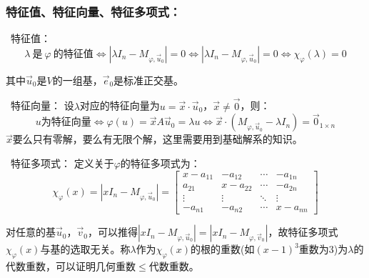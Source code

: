\documentclass[zihao=5,UTF8]{report}
\theoremstyle{mystyle} %
\begin{document}
\subsubsection{特征值、特征向量、特征多项式：}
\ 特征值：
\begin{equation*}
    \lambda\ \text{是}\ \varphi\ \text{的特征值} \Longleftrightarrow   \left |  \lambda I_n -M_{\varphi,\vec{u}_0} \right | = 0\Longleftrightarrow\left |  \lambda I_n -M_{\varphi,\vec{u}_0} \right |  = 0 \Longleftrightarrow \chi_{\varphi}(\lambda) = 0
\end{equation*}\par
{\color{gray}\small 其中$\vec{u}_0$是$V$的一组基，$\vec{e}_0$是标准正交基。}\par
{}\ 特征向量：
设$\lambda$对应的特征向量为$u = \vec{x}\cdot \vec{u}_0$，$ \vec{x} \ne \vec{0}$，则：
\begin{equation*}
   u \text{为特征向量} \Longleftrightarrow \varphi(u) = \vec{x}A\vec{u}_0 = \lambda u \Longleftrightarrow \vec{x}\cdot ( M_{\varphi,\vec{u}_0}- \lambda I_n )  = \vec{0}_{1\times n}
\end{equation*}
{\color{gray}\small $\vec{x}$要么只有零解，要么有无限个解，这里需要用到基础解系的知识。}\par
{}\ 特征多项式：
定义关于$\varphi$的特征多项式为：
\begin{equation*}
    \chi_{\varphi}(x) = \left |x I_n  - M_{\varphi,\vec{u}_0}\right | = \begin{bmatrix}  
        x -a_{11}& -a_{12}& \cdots  & -a_{1n} \\  
        a_{21}& x -a_{22}& \cdots  & -a_{2n} \\  
        \vdots & \vdots & \ddots & \vdots \\  
        -a_{n1}& -a_{n2}& \cdots  & x-a_{nn}  
      \end{bmatrix}  
\end{equation*}\par
对任意的基$\vec{u}_0$，$\vec{v}_0$，可以推得$\left |x I_n  - M_{\varphi,\vec{u}_0}\right | = \left |x I_n  - M_{\varphi,\vec{v}_0}\right |$，故特征多项式$\chi_{\varphi}(x)$与基的选取无关。称$\lambda$作为$\chi_{\varphi}(x)$的根的重数(如$(x-1)^3$重数为3)为$\lambda$的代数重数，可以证明几何重数$\le$代数重数。
\end{document}
